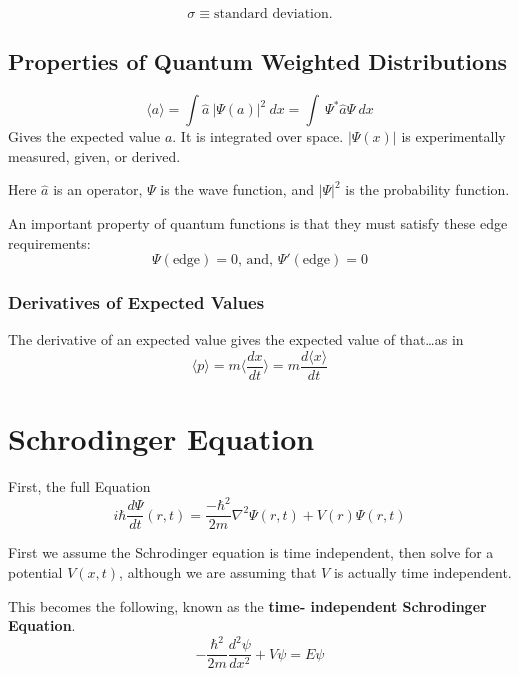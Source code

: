 \[\sigma\equiv\text{standard deviation}.\]


\subsection{Properties of Quantum Weighted Distributions}

\begin{equation}
  \langle a \rangle = \int \hat{a}~|\Psi(a)|^2~dx=\int~\Psi^{*}\hat{a}\Psi~dx
\end{equation}
Gives the expected value $ a $. It is integrated over space. $ |\Psi(x)| $ is experimentally measured, given, or derived.

Here $ \hat{a} $ is  an operator, $ \Psi $ is the wave function, and $ |\Psi|^2 $ is the probability function.

An important property of quantum functions is that they must satisfy these edge requirements:
\begin{equation}
 \Psi(\text{edge}) =0\text{, and, } \Psi'(\text{edge})=0
\end{equation}


\subsubsection{Derivatives of Expected Values}

The derivative of an expected value gives the expected value of that\ldots as in
\begin{equation}
  \langle p\rangle = m \langle \frac{dx}{dt}\rangle = m \frac{d\langle x\rangle}{dt}
\end{equation}





\section{Schrodinger Equation}
First, the full Equation
\begin{equation}
  i\hbar \frac{d\Psi}{dt}(r,t)=\frac{-\hbar^2}{2m}\nabla^2\Psi(r,t)+V(r)\Psi(r,t)
\end{equation}



First we assume the Schrodinger equation is time independent, then solve for a potential $ V (x,t) $, although we are assuming that $ V $ is actually time independent.

This becomes the following, known as the \textbf{time\-- independent Schrodinger Equation}.
\begin{equation}
  -\frac{\hbar^2}{2m}\frac{d^2\psi}{dx^2}+V\psi=E\psi
\end{equation}

